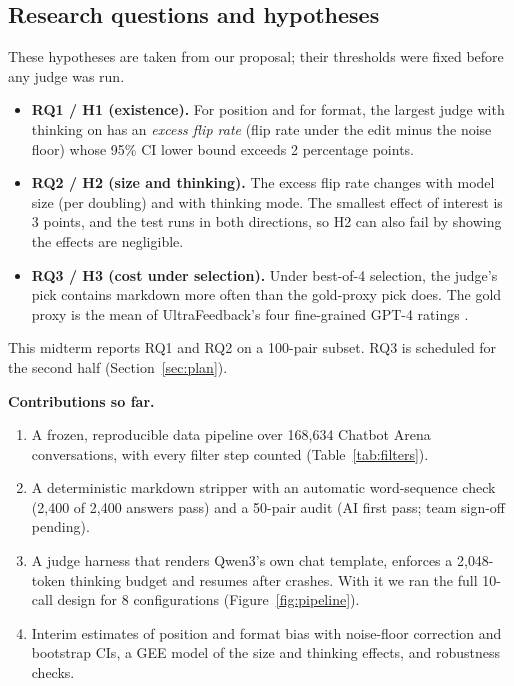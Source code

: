 \documentclass[10pt]{article}
\begin{document}
\subsection{Research questions and hypotheses}
These hypotheses are taken from our proposal; their thresholds were fixed before any judge was run.
\begin{itemize}
\item \textbf{RQ1 / H1 (existence).} For position and for format, the largest judge with thinking on has an
\emph{excess flip rate} (flip rate under the edit minus the noise floor) whose 95\% CI lower bound exceeds
2 percentage points.
\item \textbf{RQ2 / H2 (size and thinking).} The excess flip rate changes with model size (per doubling) and with
thinking mode. The smallest effect of interest is 3 points, and the test runs in both directions, so H2 can also
fail by showing the effects are negligible.
\item \textbf{RQ3 / H3 (cost under selection).} Under best-of-4 selection, the judge's pick contains markdown
more often than the gold-proxy pick does. The gold proxy is the mean of UltraFeedback's four
fine-grained GPT-4 ratings \citep{cui2024ultrafeedback}.
\end{itemize}
This midterm reports RQ1 and RQ2 on a 100-pair subset. RQ3 is scheduled for the second half (Section~\ref{sec:plan}).

\textbf{Contributions so far.}
\begin{enumerate}
\item A frozen, reproducible data pipeline over 168{,}634 Chatbot Arena conversations, with every filter step
counted (Table~\ref{tab:filters}).
\item A deterministic markdown stripper with an automatic word-sequence check (2{,}400 of 2{,}400 answers pass)
and a 50-pair audit (AI first pass; team sign-off pending).
\item A judge harness that renders Qwen3's own chat template, enforces a 2{,}048-token thinking budget and resumes
after crashes. With it we ran the full 10-call design for 8 configurations (Figure~\ref{fig:pipeline}).
\item Interim estimates of position and format bias with noise-floor correction and bootstrap CIs, a GEE model of
the size and thinking effects, and robustness checks.
\end{enumerate}
\end{document}
